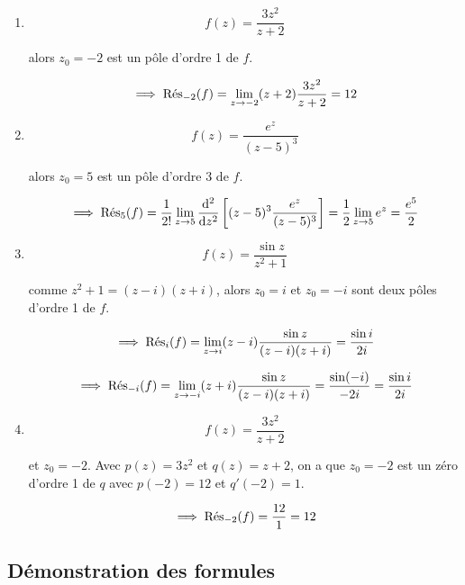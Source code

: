 \begin{example}\hfill
    
    \begin{enumerate}[label=\arabic{enumi})]
    \item 
    \[ f(z) = \frac{3z^2}{z + 2} \]
    
    alors $z_0 = -2$ est un pôle d'ordre 1 de $f$.
    
    \[ \implies \Res_{-2}(f) = \lim\limits_{z \rightarrow -2} (z + 2) \frac{3z^2}{z + 2} = 12 \]
    
    \item 
    \[ f(z) = \frac{e^z}{(z - 5)^3} \]
    
    alors $z_0 = 5$ est un pôle d'ordre 3 de $f$.
    
    \[ \implies \Res_{5}(f) = \frac{1}{2!} \lim\limits_{z \rightarrow 5} \frac{\dd^2}{\dz^2} \left[ (z - 5)^3 \frac{e^z}{(z - 5)^3}  \right] = \frac{1}{2} \lim\limits_{z \rightarrow 5} e^z = \frac{e^5}{2} \]
    
    \item 
    \[ f(z) = \frac{\sin z}{z^2 + 1} \]
    
    comme $z^2 + 1 = (z - i)(z + i)$, alors $z_0 = i$ et $z_0 = -i$ sont deux pôles d'ordre 1 de $f$.
    
    \[ \implies \Res_{i}(f) = \lim\limits_{z \rightarrow i} (z - i) \frac{\sin z}{(z - i)(z + i)} = \frac{\sin i}{2i} \]
    
    \[ \implies \Res_{-i}(f) = \lim\limits_{z \rightarrow -i} (z + i) \frac{\sin z}{(z - i)(z + i)} = \frac{\sin (-i)}{-2i} = \frac{\sin i}{2i} \]
    
    \item 
    \[ f(z) = \frac{3z^2}{z + 2} \]
    
    et $z_0 = -2$.
    Avec $p(z) = 3z^2$ et $q(z) = z + 2$, on a que $z_0 = -2$ est un zéro d'ordre 1 de $q$ avec $p(-2) = 12$ et $q'(-2) = 1$.
    
    \[ \implies \Res_{-2}(f) = \frac{12}{1} = 12 \]
    \end{enumerate}
    
\end{example}

\subsection{Démonstration des formules}

